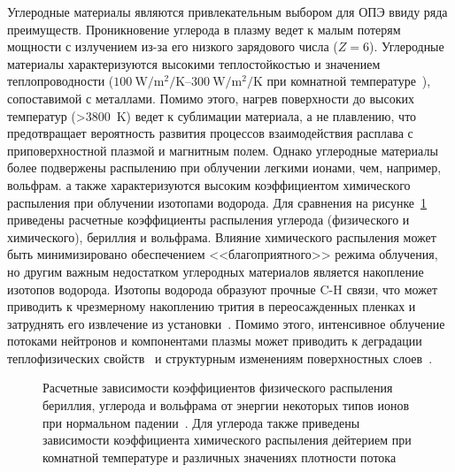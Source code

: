 Углеродные материалы являются привлекательным выбором для ОПЭ ввиду ряда преимуществ. Проникновение углерода в плазму ведет к малым потерям мощности с излучением из-за его низкого зарядового числа ($Z=6$). Углеродные материалы характеризуются высокими теплостойкостью и значением теплопроводности ($\SIrange{100}{300}{\watt\per\meter\squared\per\kelvin}$ при комнатной температуре~\cite{Merola2004, Begrambekov2023}), сопоставимой с металлами. Помимо этого, нагрев поверхности до высоких температур (>\SI{3800}{\kelvin}) ведет к сублимации материала, а не плавлению, что предотвращает вероятность развития процессов взаимодействия расплава с приповерхностной плазмой и магнитным полем. Однако углеродные материалы более подвержены распылению при облучении легкими ионами, чем, например, вольфрам. а также характеризуются высоким коэффициентом химического распыления при облучении изотопами водорода. Для сравнения на рисунке~\cref{fig:ch1/sputerring_yields} приведены расчетные коэффициенты распыления углерода (физического и химического), бериллия и вольфрама. Влияние химического распыления может быть минимизировано обеспечением <<благоприятного>> режима облучения, но другим важным недостатком углеродных материалов является накопление изотопов водорода. Изотопы водорода образуют прочные C-H связи, что может приводить к чрезмерному накоплению трития в переосажденных пленках и затруднять его извлечение из установки~\cite{Gasparyan2024}. Помимо этого, интенсивное облучение потоками нейтронов и компонентами плазмы может приводить к деградации теплофизических свойств~\cite{Wu1994} и структурным изменениям поверхностных слоев~\cite{Wang2018,Begrambekov2019,Seyedhabashi2025}.

\begin{figure}[ht]
    \caption{Расчетные зависимости коэффициентов физического распыления бериллия, углерода и вольфрама от энергии некоторых типов ионов при нормальном падении~\cite{international2001iaea, behrisch_2025}. Для углерода также приведены зависимости коэффициента химического распыления дейтерием при комнатной температуре и различных значениях плотности потока~\cite{Roth1999,Roth2004}}\label{fig:ch1/sputerring_yields}
\end{figure}

